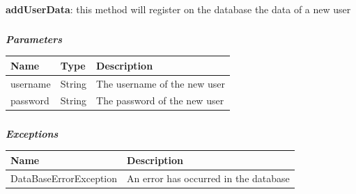 					\paragraph{}
					\vspace{-2mm}
							\textbf{addUserData}: this method will register on the database the data of a new user
							\subparagraph{}
							\vspace{-3mm}
							\textit{\textbf{Parameters}}
							\vspace{-2mm}
								\begin{table}[!h]
									\begin{tabular}{L{0.2\textwidth}L{0.15\textwidth}L{0.45\textwidth}}
										\toprule
										\textbf{Name} & \textbf{Type} & \textbf{Description} \\
										\midrule
								  		username & String & The username of the new user \\
								  		password & String & The password of the new user \\
								 		\bottomrule
									\end{tabular}
								\end{table}
							\vspace{-6mm}
							\subparagraph{}
								\textit{\textbf{Exceptions}}
								\vspace{-2mm}
									\begin{table}[!h]
									\begin{tabular}{ll}
										\toprule
										\textbf{Name} & \textbf{Description} \\
										\midrule
								  		DataBaseErrorException & An error has occurred in the database \\ 
								 		\bottomrule
									\end{tabular}
								\end{table}
					
